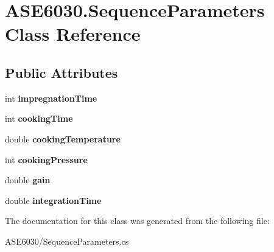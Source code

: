 \hypertarget{class_a_s_e6030_1_1_sequence_parameters}{}\section{A\+S\+E6030.\+Sequence\+Parameters Class Reference}
\label{class_a_s_e6030_1_1_sequence_parameters}
\subsection*{Public Attributes}
\begin{DoxyCompactItemize}
\item 
\mbox{\label{class_a_s_e6030_1_1_sequence_parameters_a9f894780c256e1d4ccba4d528689db2d}} 
int {\bfseries impregnation\+Time}
\item 
\mbox{\label{class_a_s_e6030_1_1_sequence_parameters_a849f7bfb15f35ea4ca038f4c4e5f147c}} 
int {\bfseries cooking\+Time}
\item 
\mbox{\label{class_a_s_e6030_1_1_sequence_parameters_aa6ea81d58306fa849f0c15d1f4d2331c}} 
double {\bfseries cooking\+Temperature}
\item 
\mbox{\label{class_a_s_e6030_1_1_sequence_parameters_a3541c0320c22637b3566458078f2865d}} 
int {\bfseries cooking\+Pressure}
\item 
\mbox{\label{class_a_s_e6030_1_1_sequence_parameters_a54ef8f65093e929f9ba6eee0531502f6}} 
double {\bfseries gain}
\item 
\mbox{\label{class_a_s_e6030_1_1_sequence_parameters_ad949634825a6ec898ea53e5483a6ba50}} 
double {\bfseries integration\+Time}
\end{DoxyCompactItemize}


The documentation for this class was generated from the following file\+:\begin{DoxyCompactItemize}
\item 
A\+S\+E6030/Sequence\+Parameters.\+cs\end{DoxyCompactItemize}
